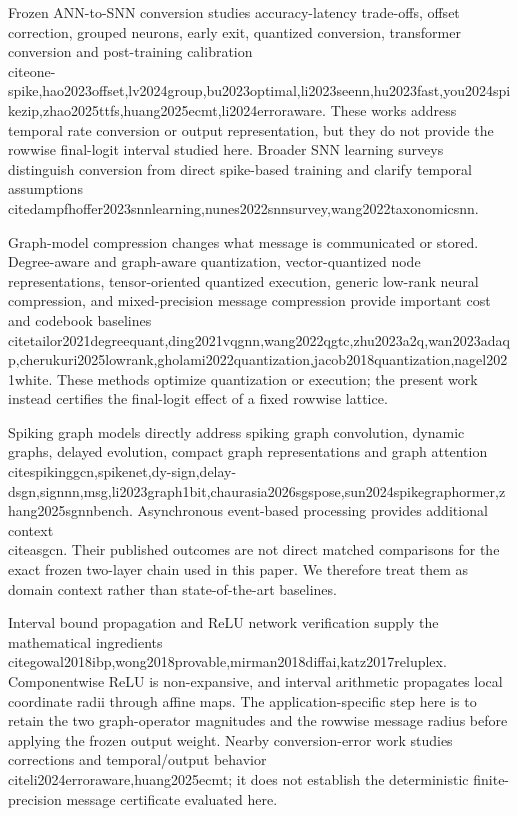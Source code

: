 \documentclass{article}
\begin{document}
\label{sec:related\_work}

Frozen ANN-to-SNN conversion studies accuracy-latency trade-offs, offset correction, grouped neurons, early exit, quantized conversion, transformer conversion and post-training calibration \\cite{one-spike,hao2023offset,lv2024group,bu2023optimal,li2023seenn,hu2023fast,you2024spikezip,zhao2025ttfs,huang2025ecmt,li2024erroraware}. These works address temporal rate conversion or output representation, but they do not provide the rowwise final-logit interval studied here. Broader SNN learning surveys distinguish conversion from direct spike-based training and clarify temporal assumptions \\cite{dampfhoffer2023snnlearning,nunes2022snnsurvey,wang2022taxonomicsnn}.

Graph-model compression changes what message is communicated or stored. Degree-aware and graph-aware quantization, vector-quantized node representations, tensor-oriented quantized execution, generic low-rank neural compression, and mixed-precision message compression provide important cost and codebook baselines \\cite{tailor2021degreequant,ding2021vqgnn,wang2022qgtc,zhu2023a2q,wan2023adaqp,cherukuri2025lowrank,gholami2022quantization,jacob2018quantization,nagel2021white}. These methods optimize quantization or execution; the present work instead certifies the final-logit effect of a fixed rowwise lattice.

Spiking graph models directly address spiking graph convolution, dynamic graphs, delayed evolution, compact graph representations and graph attention \\cite{spikinggcn,spikenet,dy-sign,delay-dsgn,signnn,msg,li2023graph1bit,chaurasia2026sgspose,sun2024spikegraphormer,zhang2025sgnnbench}. Asynchronous event-based processing provides additional context \\cite{asgcn}. Their published outcomes are not direct matched comparisons for the exact frozen two-layer chain used in this paper. We therefore treat them as domain context rather than state-of-the-art baselines.

Interval bound propagation and ReLU network verification supply the mathematical ingredients \\cite{gowal2018ibp,wong2018provable,mirman2018diffai,katz2017reluplex}. Componentwise ReLU is non-expansive, and interval arithmetic propagates local coordinate radii through affine maps. The application-specific step here is to retain the two graph-operator magnitudes and the rowwise message radius before applying the frozen output weight. Nearby conversion-error work studies corrections and temporal/output behavior \\cite{li2024erroraware,huang2025ecmt}; it does not establish the deterministic finite-precision message certificate evaluated here.
\end{document}
